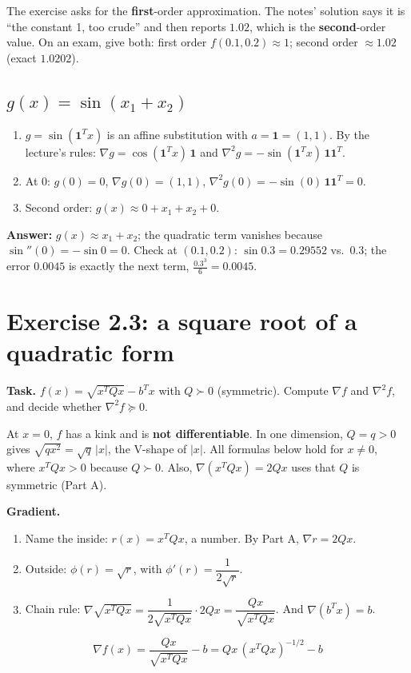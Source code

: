 \begin{pitfall}
The exercise asks for the \textbf{first}-order approximation. The notes' solution says it is ``the constant 1, too crude'' and then reports $1.02$, which is the \textbf{second}-order value.
On an exam, give both: first order $f(0.1,0.2)\approx1$; second order $\approx1.02$ (exact $1.0202$).
\end{pitfall}

\subsection*{$g(x)=\sin(x_1+x_2)$}
\begin{enumerate}
  \item $g=\sin(\mathbf1^Tx)$ is an affine substitution with $a=\mathbf1=(1,1)$. By the lecture's rules: $\nabla g=\cos(\mathbf1^Tx)\,\mathbf1$ and $\nabla^2g=-\sin(\mathbf1^Tx)\,\mathbf1\mathbf1^T$.
  \item At $0$: $g(0)=0$, $\nabla g(0)=(1,1)$, $\nabla^2g(0)=-\sin(0)\,\mathbf1\mathbf1^T=0$.
  \item Second order: $g(x)\approx0+x_1+x_2+0$.
\end{enumerate}
\textbf{Answer:} $g(x)\approx x_1+x_2$; the quadratic term vanishes because $\sin''(0)=-\sin0=0$.
Check at $(0.1,0.2)$: $\sin0.3=0.29552$ vs.\ $0.3$; the error $0.0045$ is exactly the next term, $\tfrac{0.3^3}{6}=0.0045$. \checkmark

\section{Exercise 2.3: a square root of a quadratic form \lvl{$\bullet\bullet\circ$}}

\textbf{Task.} $f(x)=\sqrt{x^TQx}-b^Tx$ with $Q\succ0$ (symmetric). Compute $\nabla f$ and $\nabla^2f$, and decide whether $\nabla^2f\succeq0$.

\begin{pitfall}
At $x=0$, $f$ has a kink and is \textbf{not differentiable}. In one dimension, $Q=q>0$ gives $\sqrt{qx^2}=\sqrt q\,|x|$, the V-shape of $|x|$.
All formulas below hold for $x\ne0$, where $x^TQx>0$ because $Q\succ0$. Also, $\nabla(x^TQx)=2Qx$ uses that $Q$ is symmetric (Part A).
\end{pitfall}

\textbf{Gradient.}
\begin{enumerate}
  \item Name the inside: $r(x)=x^TQx$, a number. By Part A, $\nabla r=2Qx$.
  \item Outside: $\phi(r)=\sqrt r$, with $\phi'(r)=\dfrac1{2\sqrt r}$.
  \item Chain rule: $\nabla\sqrt{x^TQx}=\dfrac{1}{2\sqrt{x^TQx}}\cdot2Qx=\dfrac{Qx}{\sqrt{x^TQx}}$. And $\nabla(b^Tx)=b$.
\end{enumerate}
\[ \boxed{\ \nabla f(x)=\frac{Qx}{\sqrt{x^TQx}}-b=Qx\,(x^TQx)^{-1/2}-b\ } \]


